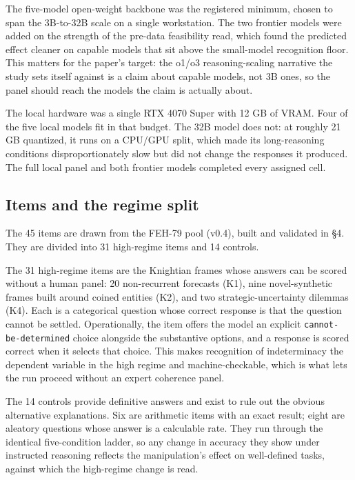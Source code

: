 \documentclass{article}
\begin{document}
The five-model open-weight backbone was the registered minimum, chosen
to span the 3B-to-32B scale on a single workstation. The two frontier
models were added on the strength of the pre-data feasibility read,
which found the predicted effect cleaner on capable models that sit
above the small-model recognition floor. This matters for the paper's
target: the o1/o3 reasoning-scaling narrative the study sets itself
against is a claim about capable models, not 3B ones, so the panel
should reach the models the claim is actually about.

The local hardware was a single RTX 4070 Super with 12 GB of VRAM. Four
of the five local models fit in that budget. The 32B model does not: at
roughly 21 GB quantized, it runs on a CPU/GPU split, which made its
long-reasoning conditions disproportionately slow but did not change the
responses it produced. The full local panel and both frontier models
completed every assigned cell.

\subsection{Items and the regime
split}\label{items-and-the-regime-split}

The 45 items are drawn from the FEH-79 pool (v0.4), built and validated
in \S{}4. They are divided into 31 high-regime items and 14 controls.

The 31 high-regime items are the Knightian frames whose answers can be
scored without a human panel: 20 non-recurrent forecasts (K1), nine
novel-synthetic frames built around coined entities (K2), and two
strategic-uncertainty dilemmas (K4). Each is a categorical question
whose correct response is that the question cannot be settled.
Operationally, the item offers the model an explicit
\texttt{cannot-be-determined} choice alongside the substantive options,
and a response is scored correct when it selects that choice. This makes
recognition of indeterminacy the dependent variable in the high regime
and machine-checkable, which is what lets the run proceed without an
expert coherence panel.

The 14 controls provide definitive answers and exist to rule out the
obvious alternative explanations. Six are arithmetic items with an exact
result; eight are aleatory questions whose answer is a calculable rate.
They run through the identical five-condition ladder, so any change in
accuracy they show under instructed reasoning reflects the
manipulation's effect on well-defined tasks, against which the
high-regime change is read.
\end{document}
